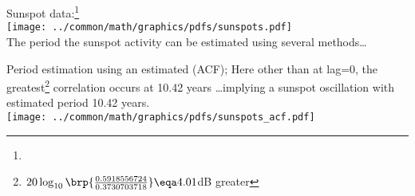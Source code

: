 
Sunspot data:\footnote{}
\\\texttt{[image: ../common/math/graphics/pdfs/sunspots.pdf]}
\\The period the sunspot activity can be estimated using several methods\ldots

\begin{example}
\label{ex:sunspots}
\label{ex:sunspot_period_ACF}
Period estimation using an estimated  (ACF);
Here other than at lag=0, the greatest\footnote{$20\log_{10}\brp{\frac{0.5918556724}{0.3730703718}}\eqa4.01$dB greater}
 correlation occurs at 10.42 years \ldots implying a sunspot oscillation with estimated period 10.42 years.
\\\texttt{[image: ../common/math/graphics/pdfs/sunspots\_acf.pdf]}
\end{example}

